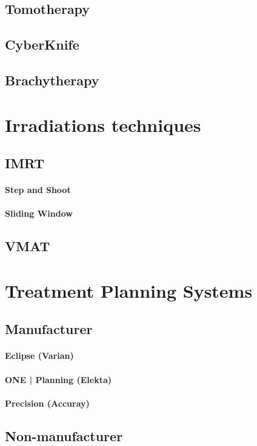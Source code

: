 \subsection{Tomotherapy}
\subsection{CyberKnife}
\subsection{Brachytherapy}

\section{Irradiations techniques}
\subsection{IMRT}
\paragraph{Step and Shoot}
\paragraph{Sliding Window}
\subsection{VMAT}

\section{Treatment Planning Systems}
\subsection{Manufacturer}
\paragraph{Eclipse (Varian)}
\paragraph{ONE | Planning (Elekta)}
\paragraph{Precision (Accuray)}
\subsection{Non-manufacturer}
